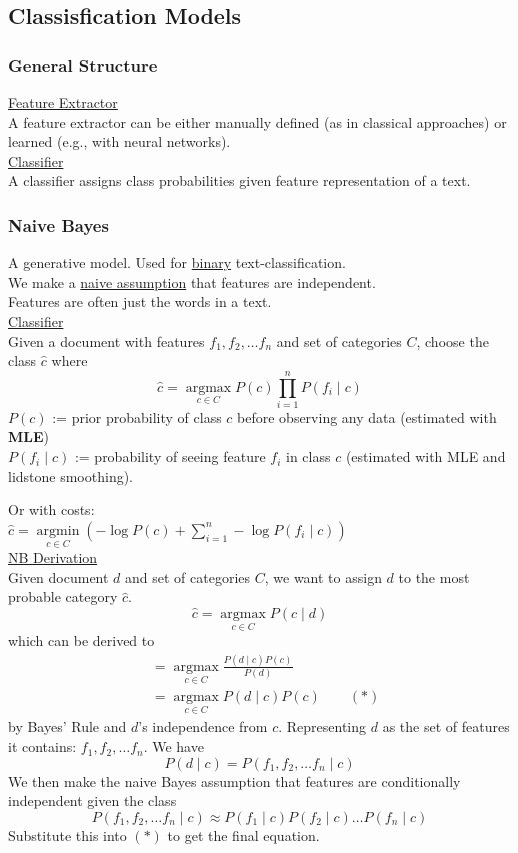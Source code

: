 \documentclass[8pt]{extarticle} %
\begin{document}
\begin{multicols*}{3}
\subsection*{Classisfication Models}
\subsubsection*{General Structure}
\underline{Feature Extractor}\\
A feature extractor can be either manually defined (as in classical approaches) or learned (e.g., with neural networks).\\

\underline{Classifier}\\
A classifier assigns class probabilities given feature representation of a text. 

\subsubsection*{Naive Bayes}
A generative model. Used for \underline{binary} text-classification. \\
We make a \underline{naive assumption} that features are independent. \\
Features are often just the words in a text. \\

\underline{Classifier}\\
Given a document with features $f_1, f_2, \ldots f_n$ and set of categories $C$, choose the class $\hat{c}$ where
$$
\hat{c}=\underset{c \in C}{\operatorname{argmax}} P(c) \prod_{i=1}^n P\left(f_i \mid c\right)
$$
$P(c)$ := prior probability of class $c$ before observing any data 
(estimated with \textbf{MLE})\\
$P\left(f_i \mid c\right)$ := probability of seeing feature $f_i$ in class $c$ (estimated with MLE and lidstone smoothing).

Or with costs: \\
$\hat{c}=\underset{c \in C}{\operatorname{argmin}}\left(-\log P(c)+\sum_{i=1}^n-\log P\left(f_i \mid c\right)\right)$\\

\underline{NB Derivation}\\
Given document $d$ and set of categories $C$, we want to assign $d$ to the most probable category $\hat{c}$.
$$
\hat{c}=\underset{c \in C}{\operatorname{argmax}} P(c \mid d)
$$
which can be derived to 
$$\begin{aligned} 
    & =\underset{c \in C}{\operatorname{argmax}} \frac{P(d \mid c) P(c)}{P(d)} \\ 
    & =\underset{c \in C}{\operatorname{argmax}} P(d \mid c) P(c)\qquad (*)
\end{aligned}
$$ 
by Bayes' Rule and $d$'s independence from $c$. 
Representing $d$ as the set of features it contains: $f_1, f_2, \ldots f_n$. We have
$$
P(d \mid c)=P\left(f_1, f_2, \ldots f_n \mid c\right)
$$
We then make the naive Bayes assumption that features are conditionally independent given the class
$$P\left(f_1, f_2, \ldots f_n \mid c\right) \approx P\left(f_1 \mid c\right) P\left(f_2 \mid c\right) \ldots P\left(f_n \mid c\right)$$
Substitute this into $(*)$ to get the final equation.


\end{multicols*}
\end{document}
